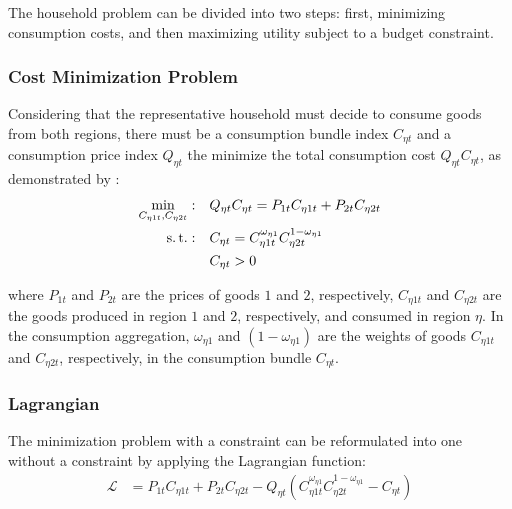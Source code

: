 \documentclass[../thesis.tex]{subfiles}
\begin{document}

The household problem can be divided into two steps: first, minimizing consumption costs, and then maximizing utility subject to a budget constraint.

\subsubsection*{Cost Minimization Problem}

Considering that the representative household must decide to consume goods from both regions, there must be a consumption bundle index $C_{\eta t}$ and a consumption price index $Q_{\eta t}$ the minimize the total consumption cost $Q_{\eta t} C_{\eta t}$, as demonstrated by \textcite[p.424]{walsh_monetary_2017}:
	\begin{align}
		\min_{C_{\eta 1 t}, C_{\eta 2 t}}: &\quad Q_{\eta t} C_{\eta t} = P_{1 t} C_{\eta 1t} + P_{2 t} C_{\eta 2t} \label{eq_v2:reg-consumption-cost}
		\\
		\operatorname{s.t.}: &\quad C_{\eta t} = C_{\eta 1 t}^{\omega_{\eta 1}} C_{\eta 2 t}^{1-\omega_{\eta 1}} \label{eq_v2:reg-consumption-aggregation} \\
		&\quad C_{\eta t} > 0 \nonumber
	\end{align}

	where $P_{1t}$ and $P_{2t}$ are the prices of goods $1$ and $2$, respectively, $C_{\eta 1 t}$ and $C_{\eta 2 t}$ are the goods produced in region $1$ and $2$, respectively, and consumed in region $\eta$. In the consumption aggregation, ${\omega_{\eta 1}}$ and $({1 - \omega_{\eta 1}})$ are the weights of goods $C_{\eta 1 t}$ and $C_{\eta 2 t}$, respectively, in the consumption bundle $C_{\eta t}$.

\subsubsection*{Lagrangian}


The minimization problem with a constraint can be reformulated into one without a constraint by applying the Lagrangian function:
	\begin{align}
		\mathcal{L} &= P_{1 t} C_{\eta 1t} + P_{2 t} C_{\eta 2t} - Q_{\eta t} (C_{\eta 1 t}^{\omega_{\eta 1}} C_{\eta 2 t}^{1-\omega_{\eta 1}} - C_{\eta t}) \label{eq_v2:reg-consumption-lagrangian}
	\end{align}
\end{document}
